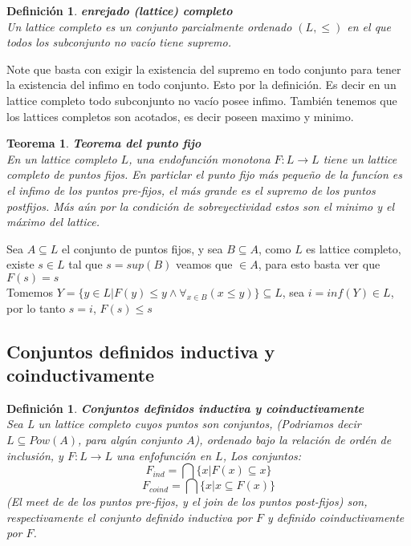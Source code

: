 \documentclass[executivepaper]{article}
\newtheorem{teo}[propo]{Teorema}
\newtheorem{defi}[propo]{Definición}
\begin{document}
\begin{defi}\textbf{enrejado (lattice) completo}\\
    Un lattice completo es un conjunto parcialmente ordenado $(L,\leq)$ en el que todos los subconjunto no vacío tiene supremo.
\end{defi}
Note que basta con exigir la existencia del supremo en todo conjunto para tener la existencia del infimo en todo conjunto. Esto por la definición. Es decir en un lattice completo todo subconjunto no vacío posee infimo. También tenemos que los lattices completos son acotados, es decir poseen maximo y minimo.

\begin{teo}\textbf{Teorema del punto fijo}\\
    En un lattice completo $L$, una endofunción monotona $F:L\rightarrow L$ tiene un lattice completo de puntos fijos. En particlar el punto fijo más pequeño de la funcíon es el infimo de los puntos pre-fijos, el más grande es el supremo de los puntos postfijos. Más aún por la condición de sobreyectividad estos son el minimo y el máximo del lattice. 
\end{teo}
Sea $A \subseteq L$ el conjunto de puntos fijos, y sea $B \subseteq A$, como $L$ es lattice completo, existe $s\in L$ tal que $s = sup(B)$ veamos que $\in A$, para esto basta ver que $F(s) = s$\\ 
Tomemos $Y=\{y\in L| F(y)\leq y \land \forall_{x\in B}(x\leq y)\} \subseteq L$, sea $i = inf (Y) \in L$, por lo tanto $s = i$, $F(s)\leq s$ 

\subsection{Conjuntos definidos inductiva y coinductivamente}

\begin{defi}\textbf{Conjuntos definidos inductiva y coinductivamente} \\
    Sea L un lattice completo cuyos puntos son conjuntos, (Podriamos decir $L\subseteq Pow(A)$, para algún conjunto $A$), ordenado bajo la relación de ordén de inclusión, y $F:L\rightarrow L$ una enfofunción en $L$, Los conjuntos:
    $$F_{ind} = \bigcap \{x|F(x)\subseteq x\}$$
    $$F_{coind} = \bigcap \{x|x\subseteq F(x)\}$$
    (El meet de de los puntos pre-fijos, y el join de los puntos post-fijos) son, respectivamente el conjunto definido inductiva por $F$ y definido coinductivamente por $F$.
\end{defi}
\end{document}
